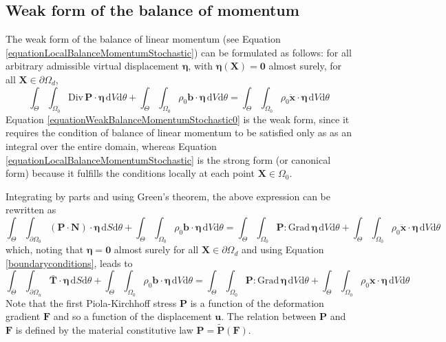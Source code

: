 \documentclass[oneside,11pt,times]{book}
\begin{document}
\subsection{Weak form of the balance of momentum}
 \label{subsectionWeakFormMomentum}

The weak form of the balance of linear momentum (see Equation \eqref{equationLocalBalanceMomentumStochastic}) can be formulated as follows: for all arbitrary admissible virtual displacement $\bm{\eta}$, with $\bm{\eta}(\bm{X}) = \bm{0}$ almost surely, for all  $\bm{X} \in \partial \Omega_{d}$,
%
\begin{equation} \label{equationWeakBalanceMomentumStochastic0}
\int_{\Theta} \int_{\Omega_0} \text{Div} \, \bm{P} \cdot \bm{\eta} \, \text{d} V\text{d}\theta + \int_{\Theta} \int_{\Omega_0} \rho_0 \bm{b} \cdot \bm{\eta}  \, \text{d} V \text{d}\theta= \int_{\Theta} \int_{\Omega_0} \rho_0 \ddot{\bm{x}} \cdot \bm{\eta}  \, \text{d} V \text{d}\theta
\end{equation}
%
Equation \eqref{equationWeakBalanceMomentumStochastic0} is the weak form, since it requires the condition of balance of linear momentum to be satisfied only as as an integral over the entire domain, whereas Equation \eqref{equationLocalBalanceMomentumStochastic} is the strong form (or canonical form) because it fulfills the conditions locally at each point $\bm{X} \in \Omega_0$.

Integrating by parts and using Green's theorem, the above expression can be rewritten as
%
\begin{equation} \label{equationWeakBalanceMomentum1}
 \int_{\Theta} \int_{\partial \Omega_0} (\bm{P} \cdot \bm{N}) \cdot \bm{\eta} \, \text{d} S \text{d}\theta + \int_{\Theta} \int_{\Omega_0} \rho_0 \bm{b} \cdot \bm{\eta}  \, \text{d} V \text{d}\theta = \int_{\Theta} \int_{\Omega_0} \bm{P} : \text{Grad} \, \bm{\eta} \, \text{d} V \text{d}\theta + \int_{\Theta} \int_{\Omega_0} \rho_0 \ddot{\bm{x}} \cdot \bm{\eta}  \, \text{d} V \text{d}\theta
\end{equation}
%
which, noting that $\bm{\eta} = \bm{0}$ almost surely for all $\bm{X} \in \partial \Omega_d$ and using Equation \eqref{boundaryconditions}, leads to
%
\begin{equation} \label{equationWeakBalanceMomentum2}
  \int_{\Theta} \int_{\partial \Omega_n} \bar{\bm{T}} \cdot \bm{\eta} \, \text{d} S \text{d}\theta  +  \int_{\Theta} \int_{\Omega_0} \rho_0 \bm{b} \cdot \bm{\eta}  \, \text{d} V \text{d}\theta  =  \int_{\Theta} \int_{\Omega_0} \bm{P} : \text{Grad} \, \bm{\eta} \, \text{d} V \text{d}\theta  +  \int_{\Theta} \int_{\Omega_0} \rho_0 \ddot{\bm{x}} \cdot \bm{\eta}  \, \text{d} V \text{d}\theta
\end{equation}
%
Note that the first Piola-Kirchhoff stress $\bm{P}$ is a function of the deformation gradient $\bm{F}$ and so a function of the displacement $\bm{u}$. The relation between $\bm{P}$ and $\bm{F}$ is defined by the material constitutive law $\bm{P} = \tilde{\bm{P}}(\bm{F})$.
\end{document}
